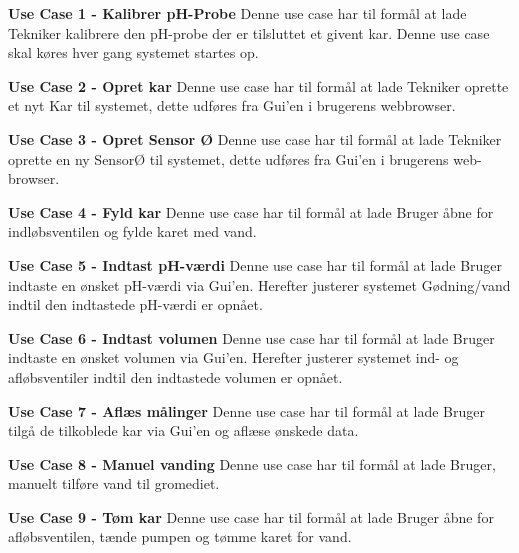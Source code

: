 \newpage
\textbf{Use Case 1 - Kalibrer pH-Probe}\newline
Denne use case har til formål at lade Tekniker kalibrere den pH-probe der er tilsluttet et givent kar. Denne use case skal køres hver gang systemet startes op.\newline

\textbf{Use Case 2 - Opret kar}\newline
Denne use case har til formål at lade Tekniker oprette et nyt Kar til systemet, dette udføres fra Gui'en i brugerens webbrowser. \newline

\textbf{Use Case 3 - Opret Sensor Ø}\newline
Denne use case har til formål at lade Tekniker oprette en ny SensorØ til systemet, dette udføres fra Gui'en i brugerens web-browser.\newline

\textbf{Use Case 4 - Fyld kar}\newline
Denne use case har til formål at lade Bruger åbne for indløbsventilen og fylde karet med vand.\newline

\textbf{Use Case 5 - Indtast pH-værdi}\newline
Denne use case har til formål at lade Bruger indtaste en ønsket pH-værdi via Gui'en. Herefter justerer systemet Gødning/vand indtil den indtastede pH-værdi er opnået. \newline

\textbf{Use Case 6 - Indtast volumen}\newline
Denne use case har til formål at lade Bruger indtaste en ønsket volumen via Gui'en. Herefter justerer systemet ind- og afløbsventiler indtil den indtastede volumen er opnået.\newline

\textbf{Use Case 7 - Aflæs målinger}\newline
Denne use case har til formål at lade Bruger tilgå de tilkoblede kar via Gui'en og aflæse ønskede data.\newline

\textbf{Use Case 8 - Manuel vanding}\newline
Denne use case har til formål at lade Bruger, manuelt tilføre vand til gromediet.\newline

\textbf{Use Case 9 - Tøm kar}\newline
Denne use case har til formål at lade Bruger åbne for afløbsventilen, tænde pumpen og tømme karet for vand.\newline

